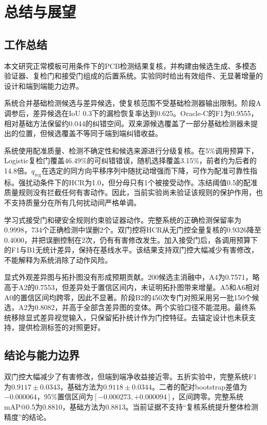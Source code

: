 \section{总结与展望}
\label{sec:conclusion}

\subsection{工作总结}

本文研究正常模板可用条件下的PCB检测结果复核，并构建由候选生成、多模态验证器、复检门和接受门组成的后置系统。实验同时给出有效组件、无显著增量的设计和端到端能力边界。

系统合并基础检测候选与差异候选，使复核范围不受基础检测器输出限制。阶段A调参后，差异候选在IoU 0.3下的漏检恢复率达到0.625。Oracle-C的F1为0.9555，相对基础方法保留约0.044的纠错空间。双来源候选覆盖了一部分基础检测器未提出的位置，但候选覆盖不等同于端到端纠错收益。

系统使用配准质量、检测不确定性和候选来源进行分级复核。在5\%调用预算下，Logistic复检门覆盖46.49\%的可纠错错误，随机选择覆盖3.15\%，前者约为后者的14.8倍。$q_{\mathrm{reg}}$在选定的同方向平移序列中随扰动增强而下降，可作为配准可靠性指标。强扰动条件下的HCR为1.0，但分母只有1个被接受动作。冻结阈值0.5的配准质量规则没有拦截任何有害动作。因此，当前实验尚未验证该规则的保护作用，也不支持质量分在所有几何扰动间严格单调。

学习式接受门和硬安全规则约束验证器动作。完整系统的正确检测保留率为0.9998，734个正确检测中误删2个。双门控将HCR从无门控全量复核的0.9326降至0.4000，并把误删控制在2次，仍有有害修改发生。加入接受门后，各调用预算下的F1与B1无统计差异，保持在基线水平。该结果支持双门控大幅减少有害修改，不能解释为系统消除了动作风险。

显式外观差异图与拓扑图没有形成预期贡献。200候选主消融中，A4为0.7571，略高于A2的0.7553，但差异处于置信区间内，未证明拓扑图带来增量。A5和A6相对A0的置信区间均跨零，因此不显著。阶段B2的450次专门对照采用另一批150个候选，A2为0.8082，并高于全部含差异图的变体。两个实验口径不能混用。最终系统移除显式差异视觉输入，只保留拓扑统计作为门控特征。去锚定设计也未获支持，提供检测标签的对照更好。

\subsection{结论与能力边界}

双门控大幅减少了有害修改，但端到端净收益接近零。五折实验中，完整系统F1为$0.9117\pm0.0343$，基础方法为$0.9118\pm0.0344$。二者的配对bootstrap差值为$-0.000064$，95\%置信区间为$[-0.000273,+0.000094]$，区间跨零。完整系统mAP@0.5为0.8810，基础方法为0.8813。当前证据不支持“复核系统提升整体检测精度”的结论。

